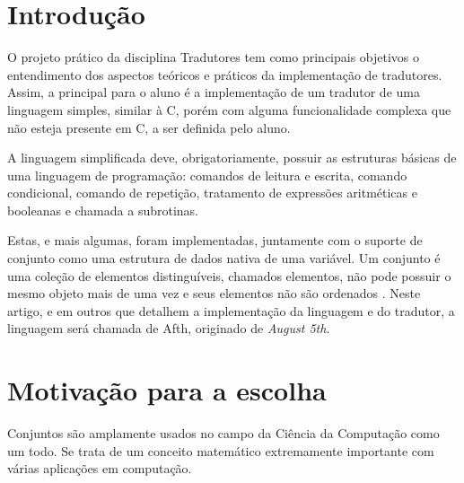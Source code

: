\documentclass[
	article,			%
	11pt,				%
	oneside,			%
	a4paper,			%
	english,			%
	brazil,				%
	sumario=tradicional
	]{abntex2}
\begin{document}

\begin{center}\smaller
	
	
\end{center}

\textual

\section{Introdução}

O projeto prático da disciplina Tradutores tem como principais objetivos o entendimento
dos aspectos teóricos e práticos da implementação de tradutores. Assim, a principal
para o aluno é a implementação de um tradutor de uma linguagem simples, similar à C,
porém com alguma funcionalidade complexa que não esteja presente em C,
a ser definida pelo aluno.

A linguagem simplificada deve, obrigatoriamente, possuir as estruturas básicas de uma
linguagem de programação: comandos de leitura e escrita, comando condicional,
comando de repetição, tratamento de expressões aritméticas e booleanas e chamada a
subrotinas.

Estas, e mais algumas, foram implementadas, juntamente com o suporte de conjunto
como uma estrutura de dados nativa de uma variável. Um conjunto é uma coleção de elementos distinguíveis, chamados
elementos, não pode possuir o mesmo objeto mais de uma vez e seus elementos não são ordenados
\cite[Apêndice B.1]{Cormen:2009:IAT:1614191}. Neste artigo, e em outros que detalhem a implementação da linguagem e do tradutor, a linguagem
será chamada de Afth, originado de \textit{August 5th}.

\section{Motivação para a escolha}

Conjuntos são amplamente usados no campo da Ciência da Computação
como um todo. Se trata de um conceito matemático extremamente importante
com várias aplicações em computação.
\end{document}

